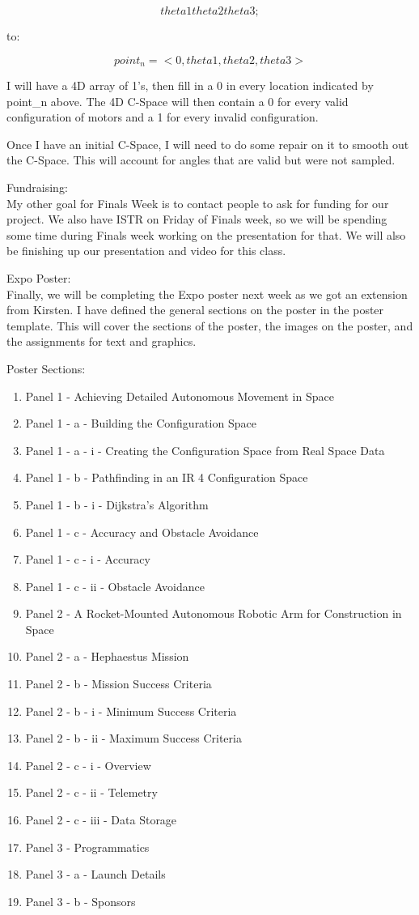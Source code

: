 \[ theta1 theta2 theta3 ; \]

to:

\[ point_n = <0, theta1, theta2, theta3> \]

I will have a 4D array of 1's, then fill in a 0 in every location indicated by point\_n above. The 4D C-Space will then contain a 0 for every valid configuration of motors and a 1 for every invalid configuration.

Once I have an initial C-Space, I will need to do some repair on it to smooth out the C-Space. This will account for angles that are valid but were not sampled.

Fundraising: \\ 
My other goal for Finals Week is to contact people to ask for funding for our project. We also have ISTR on Friday of Finals week, so we will be spending some time during Finals week working on the presentation for that. We will also be finishing up our presentation and video for this class.

Expo Poster: \\ 
Finally, we will be completing the Expo poster next week as we got an extension from Kirsten. I have defined the general sections on the poster in the poster template. This will cover the sections of the poster, the images on the poster, and the assignments for text and graphics.

Poster Sections: \\
\begin{enumerate}
\item{Panel 1 - Achieving Detailed Autonomous Movement in Space}
\item{Panel 1 - a - Building the Configuration Space}
\item{Panel 1 - a - i - Creating the Configuration Space from Real Space Data}
\item{Panel 1 - b - Pathfinding in an IR 4 Configuration Space}
\item{Panel 1 - b - i - Dijkstra's Algorithm}
\item{Panel 1 - c - Accuracy and Obstacle Avoidance}
\item{Panel 1 - c - i - Accuracy}
\item{Panel 1 - c - ii - Obstacle Avoidance}
\item{Panel 2 - A Rocket-Mounted Autonomous Robotic Arm for Construction in Space}
\item{Panel 2 - a - Hephaestus Mission}
\item{Panel 2 - b - Mission Success Criteria}
\item{Panel 2 - b - i - Minimum Success Criteria}
\item{Panel 2 - b - ii - Maximum Success Criteria}
\item{Panel 2 - c - i - Overview}
\item{Panel 2 - c - ii - Telemetry}
\item{Panel 2 - c - iii - Data Storage}
\item{Panel 3 - Programmatics}
\item{Panel 3 - a - Launch Details}
\item{Panel 3 - b - Sponsors}
\end{enumerate}

